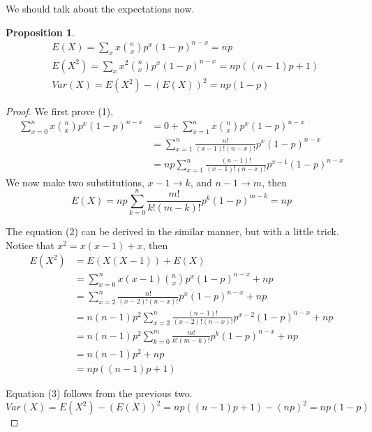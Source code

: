 \documentclass{article}
\newtheorem{prop}{Proposition}
\begin{document}
We should talk about the expectations now.
\begin{prop}
	\begin{align}
	&E(X) = \sum_x x\binom{n}{x} p^x(1-p)^{n-x} = np\\
	&E(X^2) = \sum_x x^2\binom{n}{x} p^x(1-p)^{n-x} = np((n-1)p + 1)\\
	&Var(X) = E(X^2) -(E(X))^2  = np(1-p) 
	\end{align}
\end{prop}
\begin{proof}
	We first prove (1), 
	\begin{align*}
	 \sum_{x=0}^n x\binom{n}{x} p^x(1-p)^{n-x} 
	 &= 0 + \sum_{x=1}^n x\binom{n}{x} p^x(1-p)^{n-x}   \\
	 &= \sum_{x=1}^n \frac{n!}{(x-1)!(n-x)!} p^x(1-p)^{n-x} \\
	 &= np \sum_{x=1}^n \frac{(n-1)!}{(x-1)!(n-x)!} p^{x-1}(1-p)^{n-x}
	\end{align*}
	We now make two substitutions, $x-1\to k$, and $n-1\to m$, then
	\[ E(X) = np \sum_{k=0}^n \frac{m!}{k!(m-k)!} p^k(1-p)^{m-k} = np \]
	
	The equation (2) can be derived in the similar manner, but with a little trick. Notice that $x^2 = x(x-1) + x$, then
	\begin{align*}
		E(X^2) &= E(X(X-1)) + E(X)\\
		&= \sum_{x=0}^n x(x-1)\binom{n}{x} p^x(1-p)^{n-x} + np \\
		&= \sum_{x=2}^n \frac{n!}{(x-2)!(n-x)!} p^x(1-p)^{n-x} + np \\
		&= n(n-1)p^2\sum_{x=2}^n \frac{(n-1)!}{(x-2)!(n-x)!} p^{x-2}(1-p)^{n-x} + np\\
		&= n(n-1)p^2\sum_{k=0}^m \frac{m!}{k!(m-k)!}p^k(1-p)^{n-x} + np\\
		&= n(n-1)p^2 + np\\
		&= np((n-1)p + 1)
	\end{align*} 
	
	Equation (3) follows from the previous two.
	\[ Var(X) = E(X^2) - (E(X))^2 = np((n-1)p+1) -(np)^2 = np(1-p) \]
\end{proof}
\end{document}
